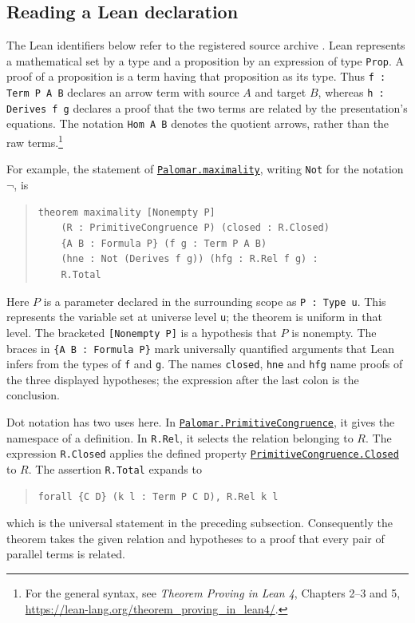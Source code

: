\documentclass[11pt]{article}
\begin{document}
\subsection{Reading a Lean declaration}\label{app:reading-lean}

The Lean identifiers below refer to the registered source archive
\cite{palomar-2026-10-30-000014-v2}.
Lean represents a mathematical set by a type and a proposition by
an expression of type \texttt{Prop}. A proof of a proposition is a
term having that proposition as its type. Thus
\texttt{f : Term P A B} declares an arrow term with source $A$
and target $B$, whereas \texttt{h : Derives f g} declares a proof
that the two terms are related by the presentation's equations.
The notation \texttt{Hom A B} denotes the quotient arrows, rather
than the raw terms.\footnote{\raggedright For the general syntax, see
\emph{Theorem Proving in Lean 4}, Chapters 2--3 and 5,
\url{https://lean-lang.org/theorem_proving_in_lean4/}.}

For example, the statement of \href{https://github.com/flengyel/Dosen-Petric-Maximality/blob/5dbee39bea09539bd130f729e82636419f71f920/DosenPetric/PalomarMaximality.lean\#L17}{\texttt{Palomar.maximality}},
writing \texttt{Not} for the notation $\neg$, is
\begin{quote}
\begin{verbatim}
theorem maximality [Nonempty P]
    (R : PrimitiveCongruence P) (closed : R.Closed)
    {A B : Formula P} (f g : Term P A B)
    (hne : Not (Derives f g)) (hfg : R.Rel f g) :
    R.Total
\end{verbatim}
\end{quote}
Here $P$ is a parameter declared in the surrounding scope as
\texttt{P : Type u}. This represents the variable set at universe
level \texttt{u}; the theorem is uniform in that level.
The bracketed \texttt{[Nonempty P]} is a hypothesis that $P$ is
nonempty. The braces in \texttt{\{A B : Formula P\}} mark
universally quantified arguments that Lean infers from the types
of \texttt{f} and \texttt{g}.
The names \texttt{closed}, \texttt{hne} and \texttt{hfg} name
proofs of the three displayed hypotheses; the expression after
the last colon is the conclusion.

Dot notation has two uses here. In
\href{https://github.com/flengyel/Dosen-Petric-Maximality/blob/5dbee39bea09539bd130f729e82636419f71f920/DosenPetric/PalomarDefinitions.lean\#L14}{\texttt{Palomar.PrimitiveCongruence}}, it gives the namespace of a
definition. In \texttt{R.Rel}, it selects the relation belonging
to $R$. The expression \texttt{R.Closed} applies the defined
property \href{https://github.com/flengyel/Dosen-Petric-Maximality/blob/5dbee39bea09539bd130f729e82636419f71f920/DosenPetric/PalomarDefinitions.lean\#L31}{\texttt{PrimitiveCongruence.Closed}} to $R$.
The assertion \texttt{R.Total} expands to
\begin{quote}
\begin{verbatim}
forall {C D} (k l : Term P C D), R.Rel k l
\end{verbatim}
\end{quote}
which is the universal statement in the preceding subsection.
Consequently the theorem takes the given relation and hypotheses
to a proof that every pair of parallel terms is related.
\end{document}
